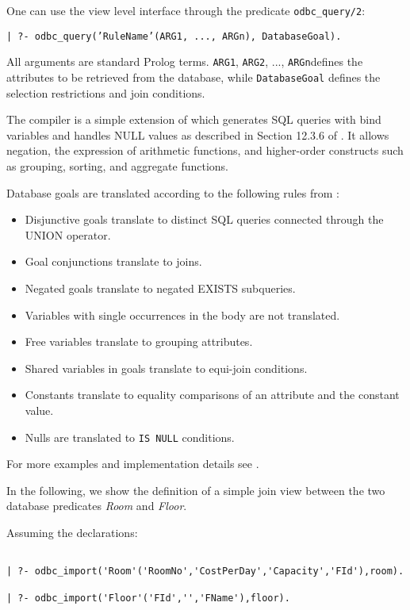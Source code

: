 One can use the view level interface through the predicate {\tt odbc\_query/2}:  
\begin{center}
{\tt | ?- odbc\_query('RuleName'(ARG1, ..., ARGn), DatabaseGoal).}
\end{center}
All arguments are standard Prolog terms.  {\tt ARG1}, {\tt ARG2}, ..., 
{\tt ARGn}defines the attributes to be retrieved from the database, while
{\tt DatabaseGoal} defines the selection restrictions and join conditions.

The compiler is a simple extension of \cite{draxler} which generates SQL
queries with bind variables and handles NULL values as described in
Section 12.3.6 of \cite{xsb-manual}.  It allows negation, the expression
of arithmetic functions, and higher-order constructs such as grouping,
sorting, and aggregate functions.

Database goals are translated according to the following rules
from \cite{draxler}:
\begin{itemize}
\item Disjunctive goals translate to distinct SQL queries
	connected through the UNION operator.
\item Goal conjunctions translate to joins.
\item Negated goals translate to negated EXISTS subqueries.
\item Variables with single occurrences in the body are not
	  translated.
\item Free variables translate to grouping attributes.
\item Shared variables in goals translate to equi-join conditions.
\item Constants translate to equality comparisons of an attribute and
	  the constant value.
\item Nulls are translated to {\tt IS NULL} conditions.
\end{itemize}
For more examples and implementation details see \cite{draxler}.
 
In the following, we show the definition of a simple join view between the 
two database predicates {\it Room} and {\it Floor}.

Assuming the declarations:
\begin{verbatim}

| ?- odbc_import('Room'('RoomNo','CostPerDay','Capacity','FId'),room).

| ?- odbc_import('Floor'('FId','','FName'),floor).
\end{verbatim}

